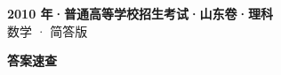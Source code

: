 \documentclass[zihao=-4, a4paper]{ctexart}
\begin{document}
\begin{center}
  {\Large\bfseries 2010 年·普通高等学校招生考试·山东卷·理科}\\[4pt]
  {\large 数学 · 简答版}
\end{center}
\medskip
{}

\clearpage
{}
\begin{center}{\Large\bfseries 答案速查}\end{center}
\medskip

\end{document}
